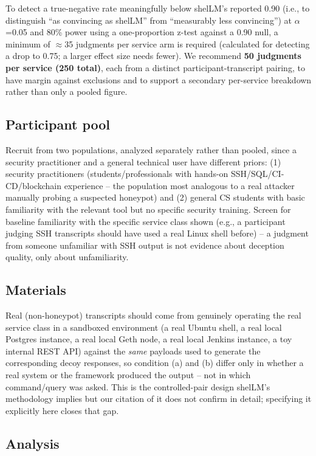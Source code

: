 \documentclass[conference]{IEEEtran}
\begin{document}
To detect a true-negative rate meaningfully below shelLM's reported
0.90 (i.e., to distinguish ``as convincing as shelLM'' from ``measurably
less convincing'') at $\alpha$=0.05 and 80\% power using a
one-proportion z-test against a 0.90 null, a minimum of $\approx$35
judgments per service arm is required (calculated for detecting a drop
to 0.75; a larger effect size needs fewer). We recommend \textbf{50
judgments per service (250 total)}, each from a distinct
participant-transcript pairing, to have margin against exclusions and to
support a secondary per-service breakdown rather than only a pooled
figure.

\subsection*{Participant pool}

Recruit from two populations, analyzed separately rather than pooled,
since a security practitioner and a general technical user have
different priors: (1) security practitioners (students/professionals
with hands-on SSH/SQL/CI-CD/blockchain experience -- the population most
analogous to a real attacker manually probing a suspected honeypot) and
(2) general CS students with basic familiarity with the relevant tool
but no specific security training. Screen for baseline familiarity with
the specific service class shown (e.g., a participant judging SSH
transcripts should have used a real Linux shell before) -- a judgment
from someone unfamiliar with SSH output is not evidence about deception
quality, only about unfamiliarity.

\subsection*{Materials}

Real (non-honeypot) transcripts should come from genuinely operating the
real service class in a sandboxed environment (a real Ubuntu shell, a
real local Postgres instance, a real local Geth node, a real local
Jenkins instance, a toy internal REST API) against the \emph{same}
payloads used to generate the corresponding decoy responses, so
condition (a) and (b) differ only in whether a real system or the
framework produced the output -- not in which command/query was asked.
This is the controlled-pair design shelLM's methodology implies but our
citation of it does not confirm in detail; specifying it explicitly here
closes that gap.

\subsection*{Analysis}
\end{document}
